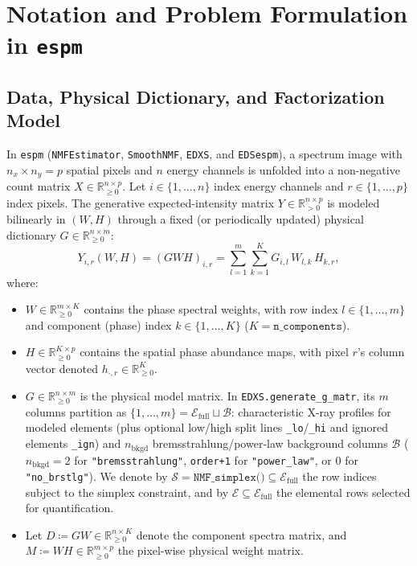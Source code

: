 \documentclass[11pt,a4paper]{article}
\theoremstyle{plain}
\theoremstyle{definition}
\theoremstyle{remark}
\newcommand{\R}{\mathbb{R}}
\newcommand{\E}{\mathcal{E}}
\newcommand{\B}{\mathcal{B}}
\newcommand{\cS}{\mathcal{S}}
\begin{document}
\tableofcontents
\newpage

\section{Notation and Problem Formulation in \texttt{espm}}

\subsection{Data, Physical Dictionary, and Factorization Model}
In \texttt{espm} (\texttt{NMFEstimator}, \texttt{SmoothNMF}, \texttt{EDXS}, and \texttt{EDSespm}), a spectrum image with $n_x \times n_y = p$ spatial pixels and $n$ energy channels is unfolded into a non-negative count matrix $X \in \R_{\ge 0}^{n \times p}$. Let $i \in \{1,\dots,n\}$ index energy channels and $r \in \{1,\dots,p\}$ index pixels. The generative expected-intensity matrix $Y \in \R_{> 0}^{n \times p}$ is modeled bilinearly in $(W,H)$ through a fixed (or periodically updated) physical dictionary $G \in \R_{\ge 0}^{n \times m}$:
\begin{equation}
\label{eq:espm_model}
Y_{i,r}(W,H) = (G W H)_{i,r} = \sum_{l=1}^{m} \sum_{k=1}^{K} G_{i,l}\, W_{l,k}\, H_{k,r},
\end{equation}
where:
\begin{itemize}[leftmargin=1.5em]
    \item $W \in \R_{\ge 0}^{m \times K}$ contains the phase spectral weights, with row index $l \in \{1,\dots,m\}$ and component (phase) index $k \in \{1,\dots,K\}$ ($K = \texttt{n\_components}$).
    \item $H \in \R_{\ge 0}^{K \times p}$ contains the spatial phase abundance maps, with pixel $r$'s column vector denoted $h_{\cdot,r} \in \R_{\ge 0}^K$.
    \item $G \in \R_{\ge 0}^{n \times m}$ is the physical model matrix. In \texttt{EDXS.generate\_g\_matr}, its $m$ columns partition as $\{1,\dots,m\} = \E_{\text{full}} \sqcup \B$: characteristic X-ray profiles for modeled elements (plus optional low/high split lines \texttt{\_lo}/\texttt{\_hi} and ignored elements \texttt{\_ign}) and $n_{\text{bkgd}}$ bremsstrahlung/power-law background columns $\B$ ($n_{\text{bkgd}}=2$ for \texttt{"bremsstrahlung"}, \texttt{order+1} for \texttt{"power\_law"}, or $0$ for \texttt{"no\_brstlg"}). We denote by $\cS = \texttt{NMF\_simplex()} \subseteq \E_{\text{full}}$ the row indices subject to the simplex constraint, and by $\E \subseteq \E_{\text{full}}$ the elemental rows selected for quantification.
    \item Let $D \coloneqq G W \in \R_{\ge 0}^{n \times K}$ denote the component spectra matrix, and $M \coloneqq W H \in \R_{\ge 0}^{m \times p}$ the pixel-wise physical weight matrix.
\end{itemize}
\end{document}
